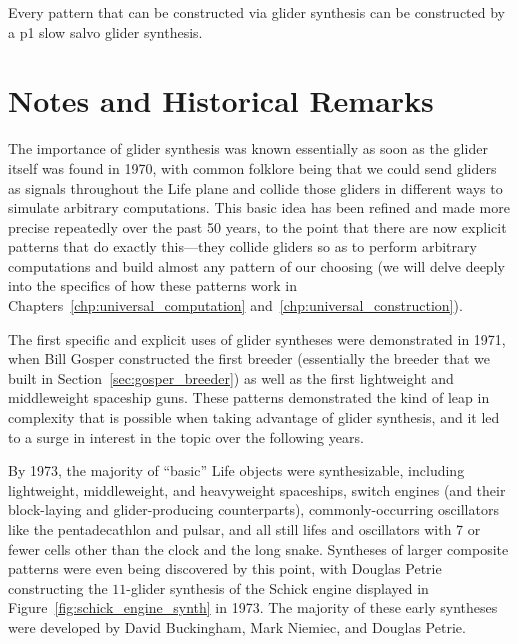 \begin{theorem}\label{thm:p1_slow_salvo}
	Every pattern that can be constructed via glider synthesis can be constructed by a p1 slow salvo glider synthesis.
\end{theorem}


\section{Notes and Historical Remarks}\label{sec:synthesis_notes}

The importance of glider synthesis was known essentially as soon as the glider itself was found in 1970, with common folklore being that we could send gliders as signals throughout the Life plane and collide those gliders in different ways to simulate arbitrary computations. This basic idea has been refined and made more precise repeatedly over the past 50 years, to the point that there are now explicit patterns that do exactly this---they collide gliders so as to perform arbitrary computations and build almost any pattern of our choosing (we will delve deeply into the specifics of how these patterns work in Chapters~\ref{chp:universal_computation} and~\ref{chp:universal_construction}).

The first specific and explicit uses of glider syntheses were demonstrated in 1971, when Bill Gosper constructed the first breeder (essentially the breeder that we built in Section~\ref{sec:gosper_breeder}) as well as the first lightweight and middleweight spaceship guns. These patterns demonstrated the kind of leap in complexity that is possible when taking advantage of glider synthesis, and it led to a surge in interest in the topic over the following years.

By 1973, the majority of ``basic'' Life objects were synthesizable, including lightweight, middleweight, and heavyweight spaceships, switch engines (and their block-laying and glider-producing counterparts), commonly-occurring oscillators like the pentadecathlon and pulsar, and all still lifes and oscillators with 7 or fewer cells other than the clock and the long snake. Syntheses of larger composite patterns were even being discovered by this point, with Douglas Petrie constructing the $11$-glider synthesis of the Schick engine displayed in Figure~\ref{fig:schick_engine_synth} in 1973. The majority of these early syntheses were developed by David Buckingham, Mark Niemiec, and Douglas Petrie.

